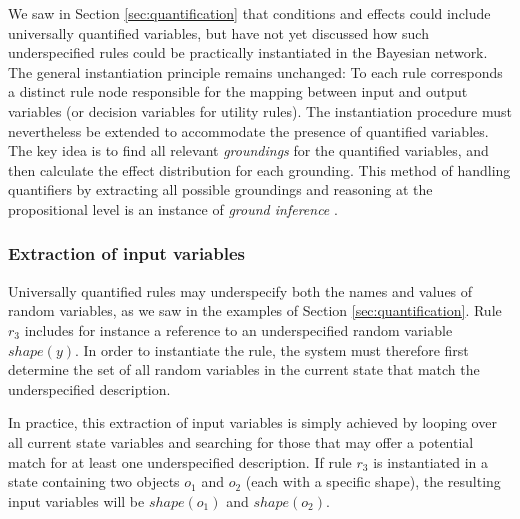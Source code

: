 We saw in Section \ref{sec:quantification} that conditions and effects could include universally quantified variables, but have not yet discussed how such underspecified rules could be practically instantiated in the Bayesian network. The general instantiation principle remains unchanged: To each rule corresponds a distinct rule node responsible for the mapping between input and output variables (or decision variables for utility rules). The instantiation procedure must nevertheless be extended to accommodate the presence of quantified variables.  The key idea is to find all relevant \textit{groundings} for the quantified variables, and then calculate the effect distribution for each grounding. This method of handling quantifiers by extracting all possible groundings and reasoning at the propositional level is an instance of \textit{ground inference} \citep{getoor:srlbook07}. 

\subsubsection*{Extraction of input variables}

Universally quantified rules may underspecify both the names and values of random variables, as we saw in the examples of Section \ref{sec:quantification}.  Rule $r_3$ includes for instance a reference to an underspecified random variable $\mathit{shape}(y)$.  In order to instantiate the rule, the system must therefore first determine the set of all random variables in the current state that match the underspecified description. %

In practice, this extraction of input variables is simply achieved by looping over all current state variables and searching for those that may offer a potential match for at least one underspecified description. If rule $r_3$ is instantiated in a state containing two objects $o_1$ and $o_2$ (each with a specific shape), the resulting input variables will be $\mathit{shape}(o_1)$ and $\mathit{shape}(o_2)$. 


